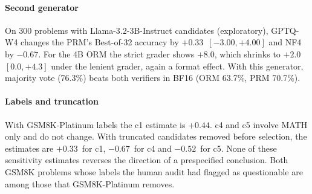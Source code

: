 \paragraph{Second generator} On 300 problems with Llama-3.2-3B-Instruct candidates
(exploratory), GPTQ-W4 changes the PRM's Best-of-32 accuracy by $+0.33$\pp\ $[-3.00,
+4.00]$ and NF4 by $-0.67$\pp. For the 4B ORM the strict grader shows $+8.0$\pp, which
shrinks to $+2.0$\pp\ $[0.0, +4.3]$ under the lenient grader, again a format effect.
With this generator, majority vote (76.3\%) beats both verifiers in BF16 (ORM 63.7\%,
PRM 70.7\%).

\paragraph{Labels and truncation} With GSM8K-Platinum labels the c1 estimate is
$+0.44$\pp. c4 and c5 involve MATH only and do not change. With truncated candidates
removed before selection, the estimates are $+0.33$\pp\ for c1, $-0.67$\pp\ for c4 and
$-0.52$\pp\ for c5. None of these sensitivity estimates reverses the direction of a
prespecified conclusion. Both GSM8K problems whose labels the human audit had flagged as
questionable are among those that GSM8K-Platinum removes.
